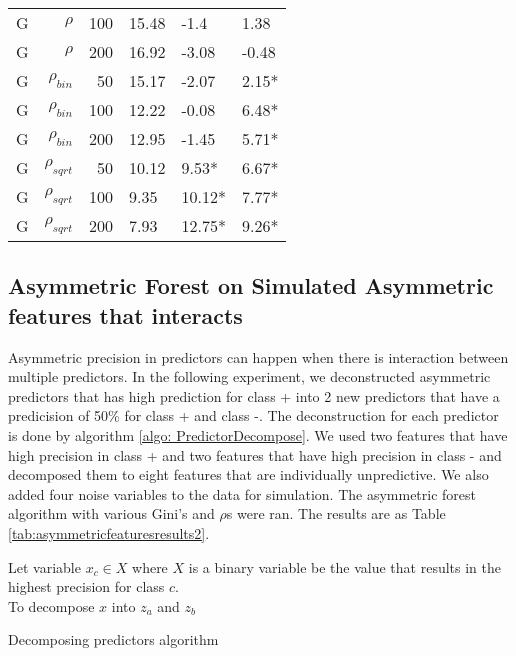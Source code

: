 \documentclass[twoside,11pt]{article}
\begin{document}
\begin{table}
\begin{tabular}{rrrp{2.5cm}p{2.5cm}p{2.5cm}}
G     & $\rho$ & 100   & 15.48 & -1.4  & 1.38 \\
G     & $\rho$ & 200   & 16.92 & -3.08 & -0.48 \\
G     & $\rho_{bin}$ & 50    & 15.17 & -2.07 & 2.15* \\
G     & $\rho_{bin}$ & 100   & 12.22 & -0.08 & 6.48* \\
G     & $\rho_{bin}$ & 200   & 12.95 & -1.45 & 5.71* \\
G     & $\rho_{sqrt}$ & 50    & 10.12 & 9.53* & 6.67* \\
G     & $\rho_{sqrt}$ & 100   & 9.35  & 10.12* & 7.77* \\
G     & $\rho_{sqrt}$ & 200   & 7.93  & 12.75* & 9.26* \bigstrut[b]\\
\hline
\end{tabular}%
\label{tab:asymmetricfeaturesresults}%
\end{table}%


\subsection{Asymmetric Forest on Simulated Asymmetric features that interacts}
Asymmetric precision in predictors can happen when there is interaction between multiple predictors. In the following experiment, we deconstructed asymmetric predictors that has high prediction for class + into 2 new predictors that have a predicision of 50\% for class + and class -. The deconstruction for each predictor is done by algorithm \ref{algo: PredictorDecompose}. We used two features that have high precision in class + and two features that have high precision in class - and decomposed them to eight features that are individually unpredictive. We also added four noise variables to the data for simulation. The asymmetric forest algorithm with various Gini's and $\rho$s were ran. The results are as Table \ref{tab:asymmetricfeaturesresults2}. 
\begin{algorithm}
Let variable $x_c\in X$ where $X$ is a binary variable be the value that results in the highest precision for class $c$.\\
To decompose $x$ into $z_a$ and $z_b$

\caption{Decomposing predictors algorithm}\label{algo: PredictorDecompose}
\end{algorithm}
\end{document}
